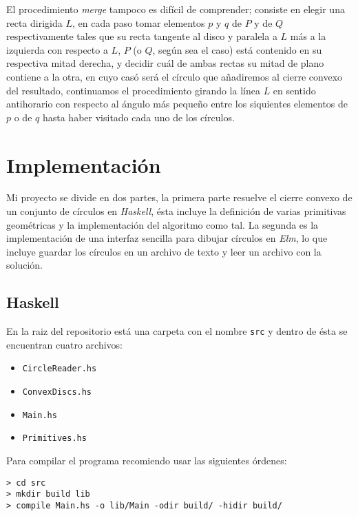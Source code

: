 \documentclass[12pt]{article}
\begin{document}
El procedimiento \textit{merge} tampoco es difícil de comprender; consiste en elegir una recta dirigida $L$, en cada paso tomar elementos $p$ y $q$ de $P$ y de $Q$ respectivamente tales que su recta tangente al disco y paralela a $L$ más a la izquierda con respecto a $L$, $P$ (o $Q$, según sea el caso) está contenido en su respectiva mitad derecha, y decidir cuál de ambas rectas su mitad de plano contiene a la otra, en cuyo casó será el círculo que añadiremos al cierre convexo del resultado, continuamos el procedimiento girando la línea $L$ en sentido antihorario con respecto al ángulo más pequeño entre los siquientes elementos de $p$ o de $q$ hasta haber visitado cada uno de los círculos.

\newpage

\section*{Implementación}

\noindent Mi proyecto se divide en dos partes, la primera parte resuelve el cierre convexo de un conjunto de círculos en \textit{Haskell}, ésta incluye la definición de varias primitivas geométricas y la implementación del algoritmo como tal. La segunda es la implementación de una interfaz sencilla para dibujar círculos  en \textit{Elm}, lo que incluye guardar los círculos en un archivo de texto y leer un archivo con la solución.

\subsection*{Haskell}

\noindent En la raiz del repositorio está una carpeta con el nombre \texttt{src} y dentro de ésta se encuentran cuatro archivos:

\begin{itemize}
\item \texttt{CircleReader.hs}
\item \texttt{ConvexDiscs.hs}
\item \texttt{Main.hs}
\item \texttt{Primitives.hs}
\end{itemize}

Para compilar el programa recomiendo usar las siguientes órdenes:

\begin{verbatim}
> cd src
> mkdir build lib
> compile Main.hs -o lib/Main -odir build/ -hidir build/
\end{verbatim}
\end{document}
